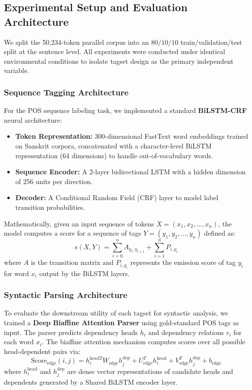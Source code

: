 \documentclass[11pt,a4paper]{article}
\begin{document}
\subsection{Experimental Setup and Evaluation Architecture}

We split the 50,234-token parallel corpus into an $80/10/10$ train/validation/test split at the sentence level. All experiments were conducted under identical environmental conditions to isolate tagset design as the primary independent variable.

\subsubsection{Sequence Tagging Architecture}
For the POS sequence labeling task, we implemented a standard \textbf{BiLSTM-CRF} neural architecture:
\begin{itemize}[leftmargin=1.5em, itemsep=0.2em]
    \item \textbf{Token Representation:} 300-dimensional FastText word embeddings trained on Sanskrit corpora, concatenated with a character-level BiLSTM representation (64 dimensions) to handle out-of-vocabulary words.
    \item \textbf{Sequence Encoder:} A 2-layer bidirectional LSTM with a hidden dimension of 256 units per direction.
    \item \textbf{Decoder:} A Conditional Random Field (CRF) layer to model label transition probabilities.
\end{itemize}

Mathematically, given an input sequence of tokens $X = (x_1, x_2, \dots, x_n)$, the model computes a score for a sequence of tags $Y = (y_1, y_2, \dots, y_n)$ defined as:
\begin{equation}
s(X, Y) = \sum_{i=0}^{n} A_{y_i, y_{i+1}} + \sum_{i=1}^{n} P_{i, y_i}
\end{equation}
where $A$ is the transition matrix and $P_{i, y_i}$ represents the emission score of tag $y_i$ for word $x_i$ output by the BiLSTM layers.

\subsubsection{Syntactic Parsing Architecture}
To evaluate the downstream utility of each tagset for syntactic analysis, we trained a \textbf{Deep Biaffine Attention Parser} using gold-standard POS tags as input. The parser predicts dependency heads $h_i$ and dependency relations $r_i$ for each word $x_i$. The biaffine attention mechanism computes scores over all possible head-dependent pairs via:
\begin{equation}
\text{Score}_{\text{edge}}(i, j) = h_i^{\text{head} T} W_{\text{edge}} h_j^{\text{dep}} + U_{\text{edge}}^T h_i^{\text{head}} + V_{\text{edge}}^T h_j^{\text{dep}} + b_{\text{edge}}
\end{equation}
where $h_i^{\text{head}}$ and $h_j^{\text{dep}}$ are dense vector representations of candidate heads and dependents generated by a Shared BiLSTM encoder layer.
\end{document}
